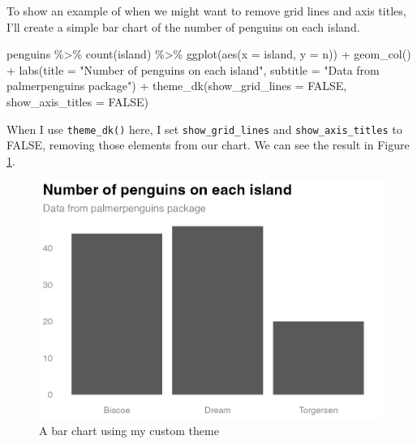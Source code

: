 \documentclass[
]{book}
\newenvironment{Shaded}{\begin{snugshade}}{\end{snugshade}}
\newcommand{\AttributeTok}[1]{\textcolor[rgb]{0.77,0.63,0.00}{#1}}
\newcommand{\ConstantTok}[1]{\textcolor[rgb]{0.00,0.00,0.00}{#1}}
\newcommand{\FunctionTok}[1]{\textcolor[rgb]{0.00,0.00,0.00}{#1}}
\newcommand{\NormalTok}[1]{#1}
\newcommand{\SpecialCharTok}[1]{\textcolor[rgb]{0.00,0.00,0.00}{#1}}
\newcommand{\StringTok}[1]{\textcolor[rgb]{0.31,0.60,0.02}{#1}}
\begin{document}
To show an example of when we might want to remove grid lines and axis titles, I'll create a simple bar chart of the number of penguins on each island.

\begin{Shaded}
\begin{Highlighting}[]
\NormalTok{penguins }\SpecialCharTok{\%\textgreater{}\%} 
  \FunctionTok{count}\NormalTok{(island) }\SpecialCharTok{\%\textgreater{}\%} 
  \FunctionTok{ggplot}\NormalTok{(}\FunctionTok{aes}\NormalTok{(}\AttributeTok{x =}\NormalTok{ island,}
             \AttributeTok{y =}\NormalTok{ n)) }\SpecialCharTok{+}
  \FunctionTok{geom\_col}\NormalTok{() }\SpecialCharTok{+}
  \FunctionTok{labs}\NormalTok{(}\AttributeTok{title =} \StringTok{"Number of penguins on each island"}\NormalTok{,}
       \AttributeTok{subtitle =} \StringTok{"Data from palmerpenguins package"}\NormalTok{) }\SpecialCharTok{+}
  \FunctionTok{theme\_dk}\NormalTok{(}\AttributeTok{show\_grid\_lines =} \ConstantTok{FALSE}\NormalTok{,}
           \AttributeTok{show\_axis\_titles =} \ConstantTok{FALSE}\NormalTok{)}
\end{Highlighting}
\end{Shaded}

When I use \texttt{theme\_dk()} here, I set \texttt{show\_grid\_lines} and \texttt{show\_axis\_titles} to FALSE, removing those elements from our chart. We can see the result in Figure \ref{fig:theme-dk-bar-chart}.

\begin{figure}
\includegraphics[width=1\linewidth]{packages_files/figure-latex/theme-dk-bar-chart-1} \caption{A bar chart using my custom theme}\label{fig:theme-dk-bar-chart}
\end{figure}
\end{document}
